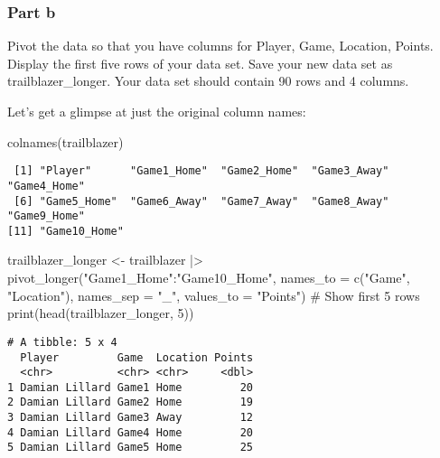 \documentclass[
  letterpaper,
  DIV=11,
  numbers=noendperiod]{scrartcl}
\newenvironment{Shaded}{\begin{snugshade}}{\end{snugshade}}
\newcommand{\AttributeTok}[1]{\textcolor[rgb]{0.40,0.45,0.13}{#1}}
\newcommand{\CommentTok}[1]{\textcolor[rgb]{0.37,0.37,0.37}{#1}}
\newcommand{\DecValTok}[1]{\textcolor[rgb]{0.68,0.00,0.00}{#1}}
\newcommand{\FunctionTok}[1]{\textcolor[rgb]{0.28,0.35,0.67}{#1}}
\newcommand{\NormalTok}[1]{\textcolor[rgb]{0.00,0.23,0.31}{#1}}
\newcommand{\OtherTok}[1]{\textcolor[rgb]{0.00,0.23,0.31}{#1}}
\newcommand{\SpecialCharTok}[1]{\textcolor[rgb]{0.37,0.37,0.37}{#1}}
\newcommand{\StringTok}[1]{\textcolor[rgb]{0.13,0.47,0.30}{#1}}
\begin{document}
\subsubsection{Part b}\label{part-b-1}

Pivot the data so that you have columns for Player, Game, Location,
Points. Display the first five rows of your data set. Save your new data
set as trailblazer\_longer. Your data set should contain 90 rows and 4
columns.

Let's get a glimpse at just the original column names:

\begin{Shaded}
\begin{Highlighting}[]
\FunctionTok{colnames}\NormalTok{(trailblazer)}
\end{Highlighting}
\end{Shaded}

\begin{verbatim}
 [1] "Player"      "Game1_Home"  "Game2_Home"  "Game3_Away"  "Game4_Home" 
 [6] "Game5_Home"  "Game6_Away"  "Game7_Away"  "Game8_Away"  "Game9_Home" 
[11] "Game10_Home"
\end{verbatim}

\begin{Shaded}
\begin{Highlighting}[]
\NormalTok{trailblazer\_longer }\OtherTok{\textless{}{-}}\NormalTok{ trailblazer }\SpecialCharTok{|\textgreater{}} 
  \FunctionTok{pivot\_longer}\NormalTok{(}\StringTok{"Game1\_Home"}\SpecialCharTok{:}\StringTok{"Game10\_Home"}\NormalTok{, }
               \AttributeTok{names\_to =} \FunctionTok{c}\NormalTok{(}\StringTok{"Game"}\NormalTok{, }\StringTok{"Location"}\NormalTok{), }
               \AttributeTok{names\_sep =} \StringTok{"\_"}\NormalTok{, }
               \AttributeTok{values\_to =} \StringTok{"Points"}\NormalTok{)}
\CommentTok{\# Show first 5 rows}
\FunctionTok{print}\NormalTok{(}\FunctionTok{head}\NormalTok{(trailblazer\_longer, }\DecValTok{5}\NormalTok{))}
\end{Highlighting}
\end{Shaded}

\begin{verbatim}
# A tibble: 5 x 4
  Player         Game  Location Points
  <chr>          <chr> <chr>     <dbl>
1 Damian Lillard Game1 Home         20
2 Damian Lillard Game2 Home         19
3 Damian Lillard Game3 Away         12
4 Damian Lillard Game4 Home         20
5 Damian Lillard Game5 Home         25
\end{verbatim}
\end{document}
